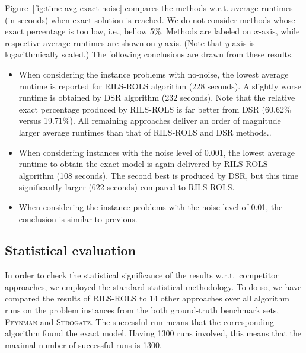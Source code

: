 \documentclass{bmcart}
\begin{document}
Figure~\ref{fig:time-avg-exact-noise} compares the methods w.r.t. average runtimes (in seconds) when exact solution is reached. We do not consider methods whose exact percentage is too low, i.e., bellow 5\%. Methods are labeled on $x$-axis, while respective average runtimes are shown on $y$-axis. (Note that $y$-axis is logarithmically scaled.) The following conclusions are drawn from these results.

\begin{itemize}
	\item When considering the instance problems with no-noise, the lowest average runtime is reported for \textsc{RILS}-\textsc{ROLS} algorithm (228 seconds). A slightly worse runtime is obtained by \textsc{DSR} algorithm (232 seconds). Note that the relative exact percentage produced by \textsc{RILS}-\textsc{ROLS} is far better from \textsc{DSR} (60.62\% versus 19.71\%). All remaining approaches deliver an order of magnitude larger average runtimes than that of \textsc{RILS}-\textsc{ROLS} and \textsc{DSR} methods..   
	\item  When considering instances with the noise level of 0.001, the lowest average runtime to obtain the exact model is again delivered by \textsc{RILS}-\textsc{ROLS} algorithm (108 seconds). The second best is produced by \textsc{DSR}, but this time significantly larger (622 seconds) compared to \textsc{RILS-ROLS}. 
	\item When considering the instance problems with the noise level of 0.01, the conclusion is similar to previous. 
\end{itemize}

\subsection{Statistical evaluation}

In order to check the statistical significance of the results w.r.t.\ competitor approaches, we employed the standard statistical methodology. To do so, we have compared the results of \textsc{RILS}-\textsc{ROLS} to 14 other approaches over all algorithm runs on the problem instances from the both ground-truth benchmark sets, \textsc{Feynman} and \textsc{Strogatz}. The successful run means that the corresponding algorithm found the exact model. Having 1300 runs involved, this means that the maximal number of successful runs is 1300. 
\end{document}

